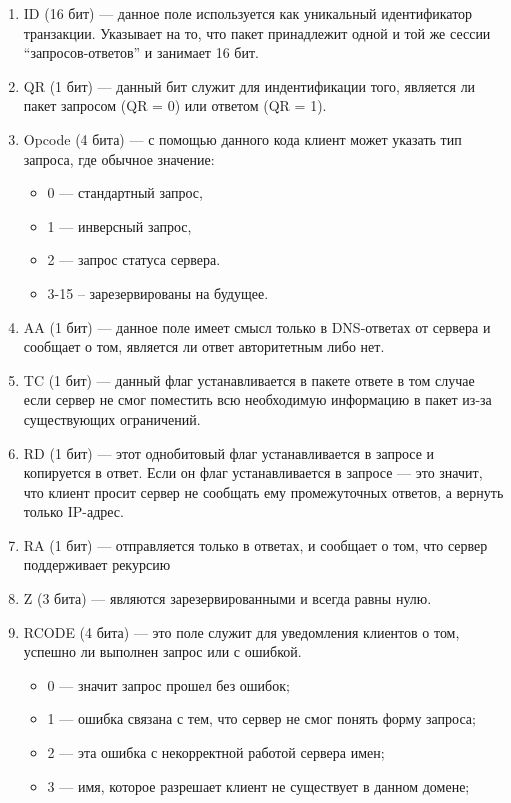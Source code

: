 \documentclass[12pt,onecolumn]{article}
\begin{document}
\begin{enumerate}
    \item ID (16 бит) — данное поле используется как уникальный идентификатор транзакции. Указывает на то, что пакет принадлежит одной и той же сессии “запросов-ответов” и занимает 16 бит.
    \item QR (1 бит) — данный бит служит для индентификации того, является ли пакет запросом (QR = 0) или ответом (QR = 1).
    \item {Opcode (4 бита) — с помощью данного кода клиент может указать тип запроса, где обычное значение:
    \begin{itemize}
        \item 0 — стандартный запрос,
        \item 1 — инверсный запрос,
        \item 2 — запрос статуса сервера.
        \item 3-15 – зарезервированы на будущее.
    \end{itemize}
    }
    \item AA (1 бит) — данное поле имеет смысл только в DNS-ответах от сервера и сообщает о том, является ли ответ авторитетным либо нет.
    \item TC (1 бит) — данный флаг устанавливается в пакете ответе в том случае если сервер не смог поместить всю необходимую информацию в пакет из-за существующих ограничений.
    \item RD (1 бит) — этот однобитовый флаг устанавливается в запросе и копируется в ответ. Если он флаг устанавливается в запросе — это значит, что клиент просит сервер не сообщать ему промежуточных ответов, а вернуть только IP-адрес.
    \item RA (1 бит) — отправляется только в ответах, и сообщает о том, что сервер поддерживает рекурсию
    \item Z (3 бита) — являются зарезервированными и всегда равны нулю.
    \item {RCODE (4 бита) — это поле служит для уведомления клиентов о том, успешно ли выполнен запрос или с ошибкой.
        \begin{itemize}
            \item 0 — значит запрос прошел без ошибок;
            \item 1 — ошибка связана с тем, что сервер не смог понять форму запроса;
            \item 2 — эта ошибка с некорректной работой сервера имен;
            \item 3 — имя, которое разрешает клиент не существует в данном домене;

\end{itemize}}
\end{enumerate}
\end{document}
